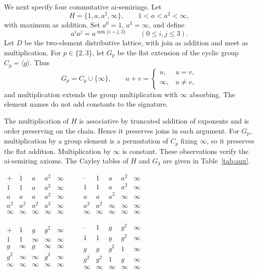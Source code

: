\documentclass[10pt,a4paper]{amsart}
\numberwithin{equation}{section}
\begin{document}
We next specify four commutative ai-semirings. Let
\[
H=\{1,a,a^2,\infty\},\qquad 1<a<a^2<\infty,
\]
with maximum as addition. Set $a^0=1$, $a^3=\infty$, and define
\[
a^ia^j=a^{\min\{i+j,3\}}\qquad(0\leq i,j\leq3).
\]
Let $D$ be the two-element distributive lattice, with join as addition and
meet as multiplication. For $p\in\{2,3\}$, let $G_p$ be the flat extension
of the cyclic group $C_p=\langle g\rangle$. Thus
\[
G_p=C_p\cup\{\infty\},\qquad
u+v=\begin{cases}u,&u=v,\\ \infty,&u\ne v,\end{cases}
\]
and multiplication extends the group multiplication with $\infty$
absorbing. The element names do not add constants to the signature.

The multiplication of $H$ is associative by truncated addition of
exponents and is order preserving on the chain. Hence it preserves joins
in each argument. For $G_p$, multiplication by a group element is a
permutation of $C_p$ fixing $\infty$, so it preserves the flat addition.
Multiplication by $\infty$ is constant. These observations verify the
ai-semiring axioms. The Cayley tables of $H$ and $G_3$ are given in
Table~\ref{tab:aux}.

\begin{table}[htbp]
\caption{The auxiliary semirings $H$ and $G_3$.}\label{tab:aux}
\centering
\renewcommand{\arraystretch}{1.06}
\setlength{\tabcolsep}{6pt}
$\begin{array}{c|cccc}
+&1&a&a^2&\infty\\\hline
1&1&a&a^2&\infty\\
a&a&a&a^2&\infty\\
a^2&a^2&a^2&a^2&\infty\\
\infty&\infty&\infty&\infty&\infty
\end{array}\qquad
\begin{array}{c|cccc}
\cdot&1&a&a^2&\infty\\\hline
1&1&a&a^2&\infty\\
a&a&a^2&\infty&\infty\\
a^2&a^2&\infty&\infty&\infty\\
\infty&\infty&\infty&\infty&\infty
\end{array}$
\par\medskip
$\begin{array}{c|cccc}
+&1&g&g^2&\infty\\\hline
1&1&\infty&\infty&\infty\\
g&\infty&g&\infty&\infty\\
g^2&\infty&\infty&g^2&\infty\\
\infty&\infty&\infty&\infty&\infty
\end{array}\qquad
\begin{array}{c|cccc}
\cdot&1&g&g^2&\infty\\\hline
1&1&g&g^2&\infty\\
g&g&g^2&1&\infty\\
g^2&g^2&1&g&\infty\\
\infty&\infty&\infty&\infty&\infty
\end{array}$
\end{table}
\end{document}
